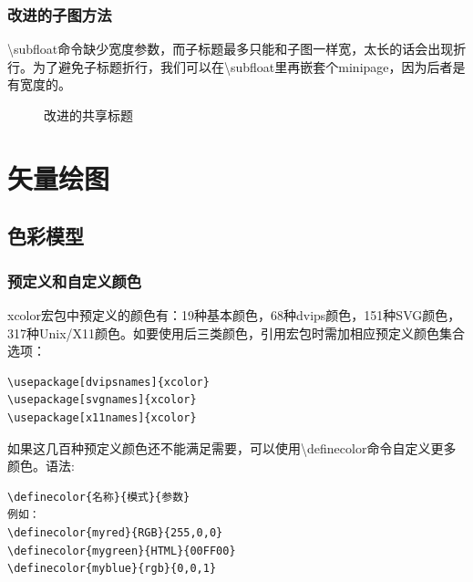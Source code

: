 \documentclass[UTF8]{article}
\begin{document}
\subsubsection{改进的子图方法}
\textbackslash subfloat命令缺少宽度参数，而子标题最多只能和子图一样宽，太长的话会出现折行。为了避免子标题折行，我们可以在\textbackslash subfloat里再嵌套个minipage，因为后者是有宽度的。
\begin{figure}[htbp]
	\centering
	\hspace{10pt}
	\caption{改进的共享标题}
\end{figure}

\section{矢量绘图}
\subsection{色彩模型}
\subsubsection{预定义和自定义颜色}
xcolor宏包中预定义的颜色有：19种基本颜色，68种dvips颜色，151种SVG颜色，317种Unix/X11颜色。如要使用后三类颜色，引用宏包时需加相应预定义颜色集合选项：
\begin{lstlisting}
\usepackage[dvipsnames]{xcolor}
\usepackage[svgnames]{xcolor}
\usepackage[x11names]{xcolor}
\end{lstlisting}
如果这几百种预定义颜色还不能满足需要，可以使用\textbackslash definecolor命令自定义更多颜色。语法: 
\begin{lstlisting}
\definecolor{名称}{模式}{参数}
例如：
\definecolor{myred}{RGB}{255,0,0}
\definecolor{mygreen}{HTML}{00FF00}
\definecolor{myblue}{rgb}{0,0,1}
\end{lstlisting}
\end{document}
